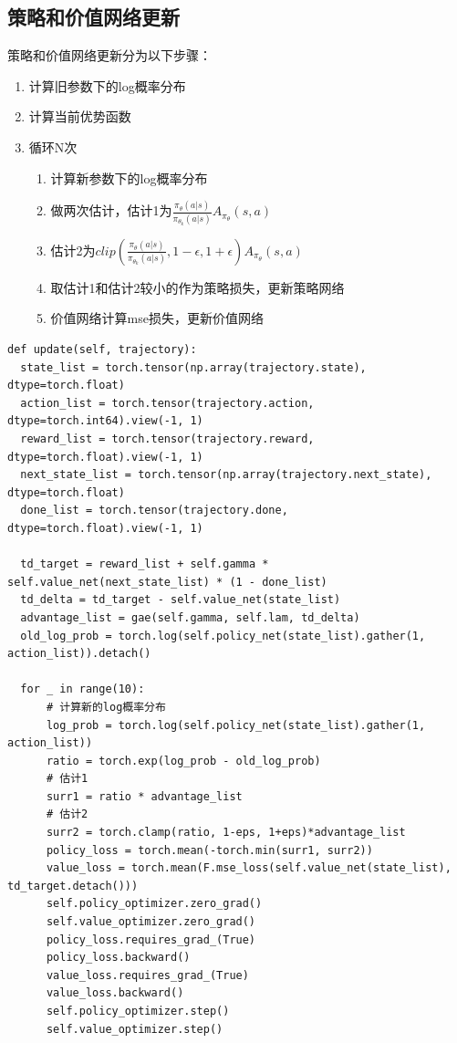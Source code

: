 \documentclass{article}
\begin{document}
\subsection{策略和价值网络更新}
策略和价值网络更新分为以下步骤：
\begin{enumerate}
  \item 计算旧参数下的log概率分布
  \item 计算当前优势函数
  \item 循环N次
  \begin{enumerate}
    \item 计算新参数下的log概率分布
    \item 做两次估计，估计1为$\frac{\pi_\theta(a|s)}{\pi_{\theta_{k}}(a|s)}A_{\pi_\theta}(s,a)$
    \item 估计2为$clip(\frac{\pi_\theta(a|s)}{\pi_{\theta_{k}}(a|s)},1-\epsilon,1+\epsilon)A_{\pi_\theta}(s,a)$
    \item 取估计1和估计2较小的作为策略损失，更新策略网络
    \item 价值网络计算mse损失，更新价值网络
  \end{enumerate}
\end{enumerate}
\begin{lstlisting}[caption = PPO-Clip策略和价值网络更新]
  def update(self, trajectory):
  state_list = torch.tensor(np.array(trajectory.state), dtype=torch.float)
  action_list = torch.tensor(trajectory.action, dtype=torch.int64).view(-1, 1)
  reward_list = torch.tensor(trajectory.reward, dtype=torch.float).view(-1, 1)
  next_state_list = torch.tensor(np.array(trajectory.next_state), dtype=torch.float)
  done_list = torch.tensor(trajectory.done, dtype=torch.float).view(-1, 1)

  td_target = reward_list + self.gamma * self.value_net(next_state_list) * (1 - done_list)
  td_delta = td_target - self.value_net(state_list)
  advantage_list = gae(self.gamma, self.lam, td_delta)
  old_log_prob = torch.log(self.policy_net(state_list).gather(1, action_list)).detach()

  for _ in range(10):
      # 计算新的log概率分布
      log_prob = torch.log(self.policy_net(state_list).gather(1, action_list))
      ratio = torch.exp(log_prob - old_log_prob)
      # 估计1
      surr1 = ratio * advantage_list
      # 估计2
      surr2 = torch.clamp(ratio, 1-eps, 1+eps)*advantage_list
      policy_loss = torch.mean(-torch.min(surr1, surr2))
      value_loss = torch.mean(F.mse_loss(self.value_net(state_list), td_target.detach()))
      self.policy_optimizer.zero_grad()
      self.value_optimizer.zero_grad()
      policy_loss.requires_grad_(True)
      policy_loss.backward()
      value_loss.requires_grad_(True)
      value_loss.backward()
      self.policy_optimizer.step()
      self.value_optimizer.step()
\end{lstlisting}
\end{document}
